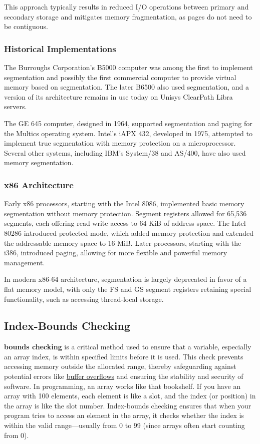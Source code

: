 \documentclass{book}
\begin{document}
This approach typically results in reduced I/O operations between primary and secondary storage and mitigates memory fragmentation, as pages do not need to be contiguous.

\subsubsection{Historical Implementations}
The Burroughs Corporation's B5000 computer was among the first to implement segmentation and possibly the first commercial computer to provide virtual memory based on segmentation. The later B6500 also used segmentation, and a version of its architecture remains in use today on Unisys ClearPath Libra servers.

The GE 645 computer, designed in 1964, supported segmentation and paging for the Multics operating system. Intel's iAPX 432, developed in 1975, attempted to implement true segmentation with memory protection on a microprocessor. Several other systems, including IBM's System/38 and AS/400, have also used memory segmentation.

\subsubsection{x86 Architecture}
Early x86 processors, starting with the Intel 8086, implemented basic memory segmentation without memory protection. Segment registers allowed for 65,536 segments, each offering read-write access to 64 KiB of address space. The Intel 80286 introduced protected mode, which added memory protection and extended the addressable memory space to 16 MiB. Later processors, starting with the i386, introduced paging, allowing for more flexible and powerful memory management.

In modern x86-64 architecture, segmentation is largely deprecated in favor of a flat memory model, with only the FS and GS segment registers retaining special functionality, such as accessing thread-local storage.

\subsection{Index-Bounds Checking}
\textbf{bounds checking} is a critical method used to ensure that a variable, especially an array index, is within specified limits before it is used. This check prevents accessing memory outside the allocated range, thereby safeguarding against potential errors like \href{https://en.wikipedia.org/wiki/Buffer_overflow}{buffer overflows} and ensuring the stability and security of software. In programming, an array works like that bookshelf. If you have an array with 100 elements, each element is like a slot, and the index (or position) in the array is like the slot number. Index-bounds checking ensures that when your program tries to access an element in the array, it checks whether the index is within the valid range—usually from 0 to 99 (since arrays often start counting from 0). 
\end{document}
